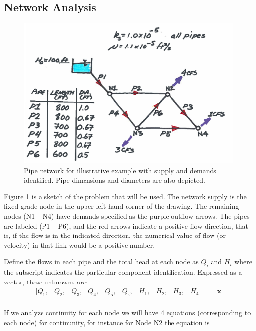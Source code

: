 \subsection{Network Analysis}
\begin{figure}[h!] %
   \centering
   \includegraphics[width=5in]{./8-PipeNetworkHydraulics/pipe-net-hybrid.jpg} 
   \caption{Pipe network for illustrative example with supply and demands identified.  Pipe dimensions and diameters are also depicted.}
   \label{fig:pipe-net-hybrid}
\end{figure}

Figure \ref{fig:pipe-net-hybrid} is a sketch of the problem that will be used.  The network supply is the fixed-grade node in the upper left hand corner of the drawing.  The remaining nodes (N1 -- N4) have demands specified as the purple outflow arrows.
The pipes are labeled (P1 -- P6), and the red arrows indicate a positive flow direction, that is, if the flow is in the indicated direction, the numerical value of flow (or velocity) in that link would be a positive number.

Define the flows in each pipe and the total head at each node as $Q_i$ and $H_i$ where the subscript indicates the particular component identification.  Expressed as a vector, these unknowns are:
\setcounter{MaxMatrixCols}{15}
\begin{displaymath}
\begin{matrix}
[Q_1, & Q_2, & Q_3,  & Q_4, & Q_5, & Q_6, & H_1, & H_2, & H_3, &H_4 ]& =  & \textbf{x} \\
 \end{matrix}
 \end{displaymath}

If we analyze continuity for each node we will have 4 equations (corresponding to each node) for continunity, for instance for Node N2 the equation is 

